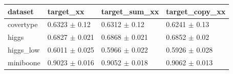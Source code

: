 \begin{tabular}{llll}
\toprule
dataset & target\_xx & target\_sum\_xx & target\_copy\_xx \\
\midrule
covertype & 0.6323 $\pm$ 0.12 & 0.6312 $\pm$ 0.12 & 0.6241 $\pm$ 0.13 \\
higgs & 0.6827 $\pm$ 0.021 & 0.6868 $\pm$ 0.021 & 0.6852 $\pm$ 0.02 \\
higgs\_low & 0.6011 $\pm$ 0.025 & 0.5966 $\pm$ 0.022 & 0.5926 $\pm$ 0.028 \\
miniboone & 0.9023 $\pm$ 0.016 & 0.9052 $\pm$ 0.018 & 0.9062 $\pm$ 0.013 \\
\bottomrule
\end{tabular}
